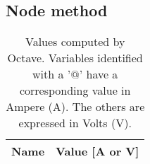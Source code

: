 
\subsection{Node method}
\label{subsec:node_met}




\begin{table}[h]
	\centering
	\begin{tabular}{|l|r|}
    		\hline    
    		{\bf Name} & {\bf Value [A or V]} \\ \hline
    		
  	\end{tabular}
  	\caption{Values computed by Octave. Variables identified with a '$@$' have a
  	corresponding value in Ampere (A). The others are expressed in Volts (V).}
 
\label{tab:oct}
\end{table}


